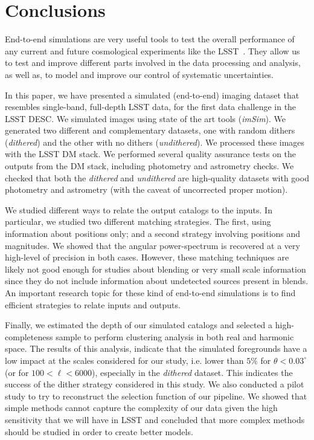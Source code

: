 \documentclass[twocolumn]{aastex62}
\begin{document}
\section{Conclusions}
\label{sec:conclusions}

End-to-end simulations are very useful tools to test the overall performance of any current and future cosmological experiments like the LSST~\citep{Overview}. They allow us to test and improve different parts involved in the data processing and analysis, as well as, to model and improve our control of systematic uncertainties.

In this paper, we have presented a simulated (end-to-end) imaging dataset that resembles single-band, full-depth LSST data, for the first data challenge in the LSST DESC. We simulated images using state of the art tools (\textit{imSim}). We generated two different and complementary datasets, one with random dithers (\textit{dithered}) and the other with no dithers (\textit{undithered}). We processed these images with the LSST DM stack. We performed several quality assurance tests on the outputs from the DM stack, including photometry and astrometry checks. We checked that both the \textit{dithered} and \textit{undithered} are high-quality datasets with good photometry and astrometry (with the caveat of uncorrected proper motion).

We studied different ways to relate the output catalogs to the inputs. In particular, we studied two different matching strategies. The first, using information about positions only; and a second strategy involving positions and magnitudes. We showed that the angular power-spectrum is recovered at a very high-level of precision in both cases. However, these matching techniques are likely not good enough for studies about blending or very small scale information since they do not include information about undetected sources present in blends. An important research topic for these kind of end-to-end simulations is to find efficient strategies to relate inputs and outputs.

Finally, we estimated the depth of our simulated catalogs and selected a high-completeness sample to perform clustering analysis in both real and harmonic space. The results of this analysis, indicate that the simulated foregrounds have a low impact at the scales considered for our study, i.e. lower than $5\%$ for $\theta < 0.03^{\circ}$ (or for $100 < \ell < 6000$), especially in the \textit{dithered} dataset. This indicates the success of the dither strategy considered in this study. We also conducted a pilot study to try to reconstruct the selection function of our pipeline. We showed that simple methods cannot capture the complexity of our data given the high sensitivity that we will have in LSST and concluded that more complex methods should be studied in order to create better models.
\end{document}
